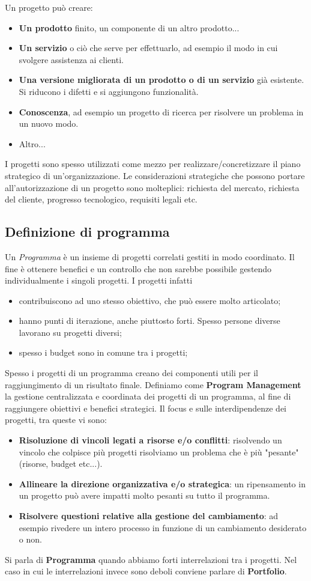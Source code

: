 Un progetto può creare:
\begin{itemize}
	\item \textbf{Un prodotto} finito, un componente di un altro prodotto...
	\item \textbf{Un servizio} o ciò che serve per effettuarlo, ad esempio il modo in cui svolgere assistenza ai clienti.
	\item \textbf{Una versione migliorata di un prodotto o di un servizio} già esistente. Si riducono i difetti e si aggiungono funzionalità.
	\item \textbf{Conoscenza}, ad esempio un progetto di ricerca per risolvere un problema in un nuovo modo.
	\item Altro...
\end{itemize}
I progetti sono spesso utilizzati come mezzo per realizzare/concretizzare il piano strategico di un'organizzazione. Le considerazioni strategiche che possono portare all'autorizzazione di un progetto sono molteplici: richiesta del mercato, richiesta del cliente, progresso tecnologico, requisiti legali etc.
\subsection{Definizione di programma}
Un \textit{Programma} è un insieme di progetti correlati gestiti in modo coordinato. Il fine è ottenere benefici e un controllo che non sarebbe possibile gestendo individualmente i singoli progetti.\newline
I progetti infatti
\begin{itemize}
	\item contribuiscono ad uno stesso obiettivo, che può essere molto articolato;
	\item hanno punti di iterazione, anche piuttosto forti. Spesso persone diverse lavorano su progetti diversi;
	\item spesso i budget sono in comune tra i progetti;
\end{itemize}
Spesso i progetti di un programma creano dei componenti utili per il raggiungimento di un risultato finale.\newline
Definiamo come \textbf{Program Management} la gestione centralizzata e coordinata dei progetti di un programma, al fine di raggiungere obiettivi e benefici strategici. Il focus e sulle interdipendenze dei progetti, tra queste vi sono:
\begin{itemize}
	\item \textbf{Risoluzione di vincoli legati a risorse e/o conflitti}: risolvendo un vincolo che colpisce più progetti risolviamo un problema che è più "pesante" (risorse, budget etc...).
	\item \textbf{Allineare la direzione organizzativa e/o strategica}: un ripensamento in un progetto può avere impatti molto pesanti su tutto il programma.
	\item \textbf{Risolvere questioni relative alla gestione del cambiamento}: ad esempio rivedere un intero processo in funzione di un cambiamento desiderato o non.
\end{itemize}
Si parla di \textbf{Programma} quando abbiamo forti interrelazioni tra i progetti. Nel caso in cui le interrelazioni invece sono deboli conviene parlare di \textbf{Portfolio}.
